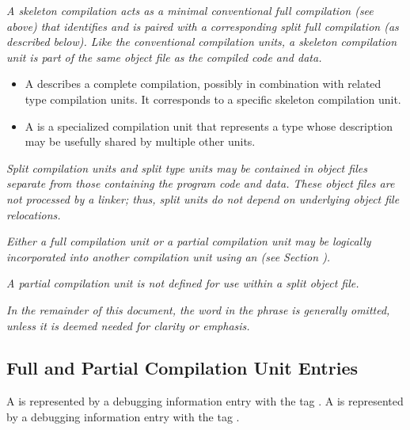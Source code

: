 \textit{A skeleton compilation acts as a minimal conventional full
compilation (see above) that identifies and is paired with a 
corresponding split full compilation (as described below). Like
the conventional compilation units, a skeleton compilation unit
is part of the same object file as the compiled code and data.}

\begin{itemize}
\item A 
 describes
a complete compilation, possibly in combination with
related type compilation units. It corresponds 
to a specific skeleton compilation unit.

\item A  is a specialized
compilation unit that represents a type whose description may
be usefully shared by multiple other units.

\end{itemize}

\textit{Split compilation units and split type units may be 
contained in object files separate from those containing the 
program code and data.
These object files are not processed by a linker; thus,
split units do not depend on underlying object file relocations.}

\textit{Either a full compilation unit or a partial compilation 
unit may be logically incorporated into another compilation unit 
using an 
(see Section ).}

\textit{A partial compilation unit is not defined for use
within a split object file.}

\textit{In the remainder of this document, the word 
 in the phrase  
is generally omitted, unless it is deemed needed for clarity 
or emphasis.}

\subsection{Full and Partial Compilation Unit Entries}
\label{chap:fullandpartialcompilationunitentries}
A  
is represented by a debugging information entry with the tag 
\DWTAGcompileunitTARG. 
A  
is represented by a debugging information entry with the tag 
\DWTAGpartialunitTARG.

